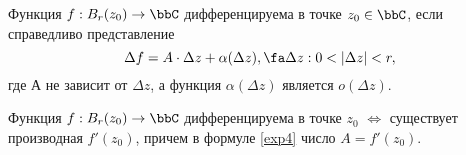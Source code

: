 \begin{leftbar}
\begin{defn}
Функция $f : B_r(z_0) \to \bbC $ дифференцируема в точке $z_0 \in \bbC$, если справедливо представление 
\begin{equation}
\label{exp4}
\Delta f = A\cdot \Delta z + \alpha(\Delta z), \fa \Delta z: 0 < |\Delta z|< r,
\end{equation}
где А не зависит от $\Delta z$, а функция $\alpha(\Delta z)$ является $o(\Delta z)$.
\end{defn}

\begin{lemm}
Функция $f : B_r(z_0) \to \bbC $ дифференцируема в точке $z_0$ $\Longleftrightarrow$ существует производная $f'(z_0)$, причем в формуле \eqref{exp4} число $A=f'(z_0)$.
\end{lemm}
\end{leftbar}

